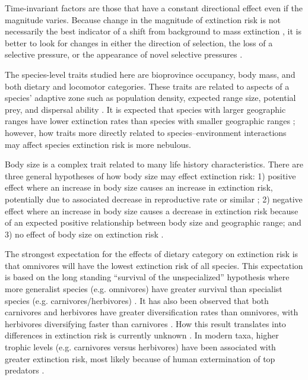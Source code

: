 \documentclass{pnastwo}
\begin{document}
\begin{article}
Time-invariant factors are those that have a constant directional effect even if the magnitude varies. Because change in the magnitude of extinction risk is not necessarily the best indicator of a shift from background to mass extinction \cite{Wang2003}, it is better to look for changes in either the direction of selection, the loss of a selective pressure, or the appearance of novel selective pressures \cite{Jablonski1986}.

The species-level traits studied here are bioprovince occupancy, body mass, and both dietary and locomotor categories. These traits are related to aspects of a species' adaptive zone such as population density, expected range size, potential prey, and dispersal ability \cite{Smith2004,Jernvall2004}. It is expected that species with larger geographic ranges have lower extinction rates than species with smaller geographic ranges \cite{Jablonski1986,Roy2009c}; however, how traits more directly related to species--environment interactions may affect species extinction risk is more nebulous.

Body size is a complex trait related to many life history characteristics. There are three general hypotheses of how body size may effect extinction risk: 1) positive effect where an increase in body size causes an increase in extinction risk, potentially due to associated decrease in reproductive rate or similar \cite{Liow2008,Liow2009}; 2) negative effect where an increase in body size causes a decrease in extinction risk because of an expected positive relationship between body size and geographic range; and 3) no effect of body size on extinction risk \cite{Tomiya2013}. 

The strongest expectation for the effects of dietary category on extinction risk is that omnivores will have the lowest extinction risk of all species. This expectation is based on the long standing ``survival of the unspecialized'' hypothesis where more generalist species (e.g. omnivores) have greater survival than specialist species (e.g. carnivores/herbivores) \cite{Simpson1944,Liow2004a}. It has also been observed that both carnivores and herbivores have greater diversification rates than omnivores, with herbivores diversifying faster than carnivores \cite{Price2012}. How this result translates into differences in extinction risk is currently unknown \cite{Rabosky2010a}. In modern taxa, higher trophic levels (e.g. carnivores versus herbivores) have been associated with greater extinction risk, most likely because of human extermination of top predators \cite{Liow2009,Purvis2000a}. 


\end{article}
\end{document}
